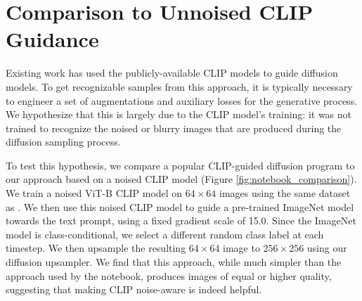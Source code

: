 \documentclass{article}
\begin{document}
\section{Comparison to Unnoised CLIP Guidance}
\label{app:unnoised_comp}

Existing work has used the publicly-available CLIP models to guide diffusion models. To get recognizable samples from this approach, it is typically necessary to engineer a set of augmentations and auxiliary losses for the generative process. We hypothesize that this is largely due to the CLIP model's training: it was not trained to recognize the noised or blurry images that are produced during the diffusion sampling process.

To test this hypothesis, we compare a popular CLIP-guided diffusion program \citep{clipdiff} to our approach based on a noised CLIP model (Figure \ref{fig:notebook_comparison}). We train a noised ViT-B CLIP model on $64 \times 64$ images using the same dataset as \citet{clip}. We then use this noised CLIP model to guide a pre-trained ImageNet model towards the text prompt, using a fixed gradient scale of 15.0. Since the ImageNet model is class-conditional, we select a different random class label at each timestep. We then upsample the resulting $64 \times 64$ image to $256 \times 256$ using our diffusion upsampler. We find that this approach, while much simpler than the approach used by the notebook, produces images of equal or higher quality, suggesting that making CLIP noise-aware is indeed helpful. 
\end{document}
